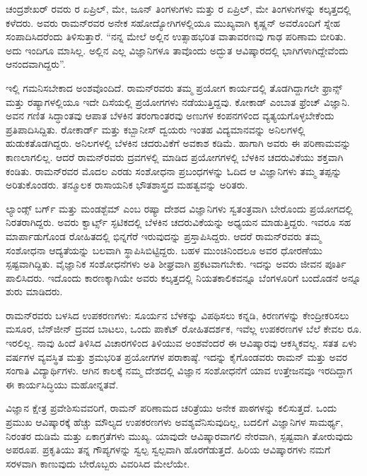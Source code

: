 ಚಂದ್ರಶೇಖರ್ ರವರು  ರ ಏಪ್ರಿಲ್, ಮೇ, ಜೂನ್ ತಿಂಗಳುಗಳು ಮತ್ತು  ರ ಏಪ್ರಿಲ್, ಮೇ ತಿಂಗಳುಗಳನ್ನು ಕಲ್ಕತ್ತದಲ್ಲಿ ಕಳೆದರು. ಅವರು ರಾಮನ್‍ರವರ ಅನೇಕ ಸಹೋದ್ಯೋಗಿಗಳಲ್ಲಿಯೂ ಮುಖ್ಯವಾಗಿ ಕೃಷ್ಣನ್ ಅವರೊಂದಿಗೆ ಸ್ನೇಹ ಸಂಪಾದಿಸಿದರೆಂದು ತಿಳಿಸುತ್ತಾರೆ. “ನನ್ನ ಮೇಲೆ ಅಲ್ಲಿನ ಉತ್ಸಾಹಭರಿತ ವಾತಾವರಣವು ಗಾಢ ಪರಿಣಾಮ ಬೀರಿತು. ಅದು ಇಂದಿಗೂ ಮಾಸಿಲ್ಲ. ಅಲ್ಲಿನ ಎಲ್ಲ ವಿಜ್ಞಾನಿಗಳೂ ತಾವೊಂದು ಅದ್ಭುತ ಆವಿಷ್ಕಾರದಲ್ಲಿ ಭಾಗಿಗಳಾಗಿದ್ದೇವೆಂದು ಆನಂದವಾಗಿದ್ದರು”.

ಇಲ್ಲಿ ಗಮನಿಸಬೇಕಾದ ಅಂಶವೊಂದಿದೆ. ರಾಮನ್‍ರವರು ತಮ್ಮ ಪ್ರಯೋಗ ಕಾರ್ಯದಲ್ಲಿ ತೊಡಗಿದ್ದಾಗಲೇ ಫ್ರಾನ್ಸ್ ಮತ್ತು ರಷ್ಯಾಗಳಲ್ಲಿಯೂ ಇದೇ ದಿಸೆಯಲ್ಲಿ ಪ್ರಯೋಗಗಳು ನಡೆಯುತ್ತಿದ್ದವು. ಕೋಕಾಡ್ ಎಂಬಾತ ಫ್ರೆಂಚ್ ವಿಜ್ಞಾನಿ. ಅವನ ಗಣಿತ ಸಿದ್ಧಾಂತವು ಆಪಾತ ಬೆಳಕಿನ ತರಂಗಾಂತರವು ಅಣುಗಳ ಕಂಪನಗಳಿಂದ ವ್ಯತ್ಯಯಗೊಳ್ಳಬೇಕೆಂದು ಪ್ರತಿಪಾದಿಸಿದ್ದಿತು. ರೋಕಾರ್ಡ್ ಮತ್ತು ಕಬ್ಬಾನೀಸ್ ದ್ವಯರು ಇಂತಹ ವಿದ್ಯಮಾನವನ್ನು ಅನಿಲಗಳಲ್ಲಿ ಹುಡುಕತೊಡಗಿದ್ದರು. ಅನಿಲಗಳಲ್ಲಿ ಬೆಳಕಿನ ಚದರುವಿಕೆಗೆ ಅವಕಾಶ ಕಡಿಮೆ. ಹಾಗಾಗಿ ಅವರು ಈ ಪರಿಣಾಮವನ್ನು ಕಾಣಲಾಗಲಿಲ್ಲ. ಆದರೆ ರಾಮನ್‍ರವರು ದ್ರವಗಳಲ್ಲಿ ಮಾಡಿದ ಪ್ರಯೋಗಗಳಲ್ಲಿ ಬೆಳಕಿನ ಚದರುವಿಕೆಯು ಶಕ್ತವಾಗಿ ಕಂಡಿತು. ರಾಮನ್‍ರವರ ಮೊದಲ ಎರಡು ಸಂಶೋಧನಾ ಪ್ರಬಂಧಗಳನ್ನು ಓದಿದ ಆ ವಿಜ್ಞಾನಿಗಳು ತಮ್ಮ ತಪ್ಪನ್ನು ಅರಿತುಕೊಂಡರು. ತನ್ಮೂಲಕ ರಾಸಾಯನಿಕ ಭೌತಶಾಸ್ತ್ರದ ಮಹತ್ವವನ್ನು ಅರಿತರು.

ಲ್ಯಾಂಡ್ಸ್ ಬರ್ಗ್ ಮತ್ತು ಮಂಡಶ್ಬೆಮ್ ಎಂಬ ರಷ್ಯಾ ದೇಶದ ವಿಜ್ಞಾನಿಗಳು ಸ್ವತಂತ್ರವಾಗಿ ಬೇರೊಂದು ಪ್ರಯೋಗದಲ್ಲಿ ನಿರತರಾಗಿದ್ದರು. ಅವರು ಕ್ವಾರ್ಟ್ಸ್ ಸ್ಫಟಿಕದಲ್ಲಿ ಬೆಳಕಿನ ಚದರುವಿಕೆಯನ್ನು ಅಧ್ಯಯನ ಮಾಡುತ್ತಿದ್ದರು. ಇವರೂ ಸಹ ಮಾರ್ಪಾಡುಗೊಂಡ ರೋಹಿತದಲ್ಲಿ ಭಿನ್ನಗೆರೆ ಇರುವುದನ್ನು ಪ್ರಸ್ತಾಪಿಸಿದ್ದರು. ಆದರೆ ರಾಮನ್‍ರವರು ತಮ್ಮ ಸಂಶೋಧನಾ ಆದ್ಯತೆಯನ್ನು ಬಲವಾಗಿ ಸ್ಥಾಪಿಸಿಬಿಟ್ಟಿದ್ದರು. ಬಹಳ ಮುಂಚಿನಿಂದಲೂ ಅವರ ಧೋರಣೆಯು ಸ್ಪಷ್ಟವಾಗಿದ್ದಿತು. ವೈಜ್ಞಾನಿಕ ಸಂಶೋಧನೆಗಳು ಅತಿ ಶೀಘ್ರವಾಗಿ ಪ್ರಕಟವಾಗಬೇಕು. ಇದನ್ನು ಅವರು ಜೀವನ ಪೂರ್ತಿ ಪಾಲಿಸಿದರು. ಇದೊಂದು ಕಾರಣಕ್ಕಾಗಿಯೇ ಅವರು ಕಲ್ಕತ್ತದಲ್ಲಿ \textit{} ನಿಯತಕಾಲಿಕವನ್ನೂ ಬೆಂಗಳೂರಿಗೆ ಬಂದೊಡನೆ \textit{} ಅನ್ನೂ ಶುರು ಮಾಡಿದರು.

ರಾಮನ್‍ರವರು ಬಳಸಿದ ಉಪಕರಣಗಳು: ಸೂರ್ಯನ ಬೆಳಕನ್ನು ವಿಪಥಿಸಲು ಕನ್ನಡಿ, ಕಿರಣಗಳನ್ನು ಕೇಂದ್ರೀಕರಿಸಲು ಮಸೂರ, ಬೆನ್‍ಜೀನ್ ದ್ರವದ ಬಾಟಲು, ಒಂದು ಪಾಕೆಟ್ ರೋಹಿತದರ್ಶಕ, ಇವೆಲ್ಲ ಉಪಕರಣಗಳ ಬೆಲೆ ಕೇವಲ ರೂ. ಇರಲಿಲ್ಲ. ನಾವು ಹಿಂದೆ ತಿಳಿಸಿದ ವಿಚಾರಗಳಿಂದ ತಿಳಿಯುವ ಅಂಶವೆಂದರೆ ಈ ಆವಿಷ್ಕಾರವು ಆಕಸ್ಮಿಕವಲ್ಲ. ಸತತ ಏಳು ವರ್ಷಗಳ ವ್ಯವಸ್ಥಿತ ಮತ್ತು ಶ್ರಮಭರಿತ ಪ್ರಯೋಗಗಳ ಪರಾಕಾಷ್ಠೆ. ಇದನ್ನು ಕೈಗೊಂಡವರು ರಾಮನ್ ಮತ್ತು ಅವರ ಸಂಗಾತಿ ವಿದ್ಯಾರ್ಥಿಗಳು. ಆಗಿನ ಕಾಲಕ್ಕೆ ನಮ್ಮ ದೇಶದಲ್ಲಿ ವಿಜ್ಞಾನ ಸಂಶೋಧನೆಗೆ ಯಾವ ಉತ್ತೇಜನವೂ ಇರದಿದ್ದಾಗ ಈ ಕಾರ್ಯಸಿದ್ಧಿಯು ಮಹೋನ್ನತವೆ.

ವಿಜ್ಞಾನ ಕ್ಷೇತ್ರ ಪ್ರವೇಶಿಸುವವರಿಗೆ, ರಾಮನ್ ಪರಿಣಾಮದ ಚರಿತ್ರೆಯು ಅನೇಕ ಪಾಠಗಳನ್ನು ಕಲಿಸುತ್ತದೆ. ಒಂದು ಪ್ರಮುಖ ಆವಿಷ್ಕಾರಕ್ಕೆ ಹೆಚ್ಚು ಮೌಲ್ಯದ ಉಪಕರಣಗಳು ಅವಶ್ಯವೆನಿಸುವುದಿಲ್ಲ, ಬದಲಿಗೆ ವಿಜ್ಞಾನಿಗಳ ಸಾಮರ್ಥ್ಯ, ನಿರಂತರ ದುಡಿಮೆ ಮತ್ತು ಏಕಾಗ್ರತೆಗಳು ಮುಖ್ಯ. ಯಾವುದೇ ಆವಿಷ್ಕಾರವಾಗಲಿ ನೇರವಾಗಿ, ಸ್ಪಷ್ಟವಾಗಿ ತೋರುವುದು ಅಪರೂಪ. ಪ್ರಕೃತಿಯು ತನ್ನ ಗೌಪ್ಯಗಳನ್ನು ಸ್ವಲ್ಪ ಸ್ವಲ್ಪವಾಗಿ ಹೊರಗೆಡುತ್ತದೆ. ಹಿರಿಯ ಆವಿಷ್ಕಾರಗಳು ನಮಗೆ ಸರಳವಾಗಿ ಕಾಣುವುದು ಬೇರೊಬ್ಬರು ವಿವರಿಸಿದ ಮೇಲೆಯೇ.


